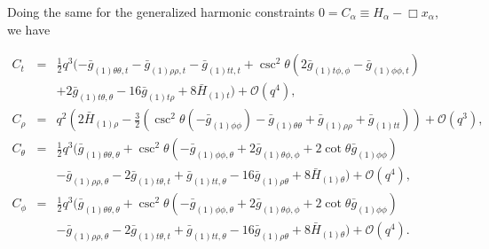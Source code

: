 \documentclass[aps,letterpaper,twocolumn,nofootinbib]{revtex4}
\numberwithin{equation}{section}
\begin{document}
Doing the same for the generalized harmonic constraints $0=C_\alpha\equiv H_\alpha-\Box x_\alpha$, we have
\vspace{\baselineskip}
\begin{widetext}
\begin{eqnarray}
\label{eqn:ct_3p1}
C_t&=&\frac{1}{2} q^3 (-\bar{g}_{(1)\theta \theta,t}-\bar{g}_{(1) \rho \rho ,t}-\bar{g}_{(1)
   \text{$tt$},t}+\csc ^2\theta \left(2 \bar{g}_{(1) \text{$t$$\phi $},\phi }-\bar{g}_{(1)
   \phi \phi ,t}\right)\nonumber\\
   &&+2 \bar{g}_{(1) \text{$t$$\theta $},\theta }-16 \bar{g}_{(1)
   \text{$t$$\rho $}}+8 \bar{H}_{(1) t})+\mathcal{O}(q^4),\\
%
\label{eqn:crho_3p1}
C_\rho&=&q^2 \left(2 \bar{H}_{(1) \rho }-\frac{3}{2} \left(\csc^2\theta \left(-\bar{g}_{(1) \phi
   \phi }\right)-\bar{g}_{(1)\theta \theta}+\bar{g}_{(1) \rho \rho }+\bar{g}_{(1)
   \text{$tt$}}\right)\right)+\mathcal{O}(q^3),\\
%
\label{eqn:ctheta_3p1}
C_\theta&=&\frac{1}{2} q^3 (\bar{g}_{(1)\theta \theta,\theta }+\csc ^2\theta
   \left(-\bar{g}_{(1) \phi \phi ,\theta }+2 \bar{g}_{(1)\theta \phi,\phi }+2 \cot \theta
    \bar{g}_{(1) \phi \phi }\right)\nonumber\\
   &&-\bar{g}_{(1) \rho \rho ,\theta }-2 \bar{g}_{(1)
   \text{$t$$\theta $},t}+\bar{g}_{(1) \text{$tt$},\theta }-16 \bar{g}_{(1) \rho \theta }+8
   \bar{H}_{(1)\theta})+\mathcal{O}(q^4),\\
%
\label{eqn:cphi_3p1}
C_\phi&=&\frac{1}{2} q^3 (\bar{g}_{(1)\theta \theta,\theta }+\csc ^2\theta
   \left(-\bar{g}_{(1) \phi \phi ,\theta }+2 \bar{g}_{(1)\theta \phi,\phi }+2 \cot \theta
    \bar{g}_{(1) \phi \phi }\right)\nonumber\\
   &&-\bar{g}_{(1) \rho \rho ,\theta }-2 \bar{g}_{(1)
   \text{$t$$\theta $},t}+\bar{g}_{(1) \text{$tt$},\theta }-16 \bar{g}_{(1) \rho \theta }+8
   \bar{H}_{(1)\theta})+\mathcal{O}(q^4).
\end{eqnarray}
\end{widetext}
\end{document}
